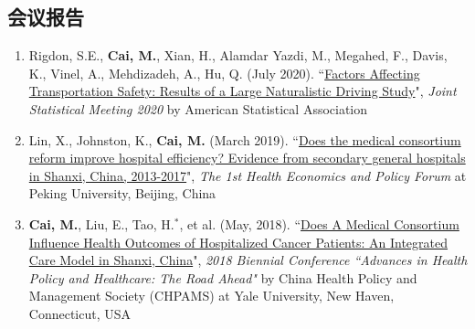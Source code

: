 \documentclass[11pt, a4paper]{article}
\newcommand{\years}[1]{\marginnote{\scriptsize #1}}
\begin{document}
	
	\subsection*{会议报告}
	\begin{enumerate}[leftmargin=0ex,itemsep=1ex]
		\item \years{2020}Rigdon, S.E., \textbf{Cai, M.}, Xian, H., Alamdar Yazdi, M., Megahed, F., Davis, K., Vinel, A., Mehdizadeh, A., Hu, Q. (July 2020). ``\ul{Factors Affecting Transportation Safety: Results of a Large Naturalistic Driving Study}", \emph{Joint Statistical Meeting 2020} by American Statistical Association
		
		\item \years{2019}Lin, X., Johnston, K., \textbf{Cai, M.} (March 2019). ``\ul{Does the medical consortium reform improve hospital efficiency? Evidence from secondary general hospitals in Shanxi, China, 2013-2017}", \emph{The 1st Health Economics and Policy Forum} at Peking University, Beijing, China
		
		\item \years{2018}\textbf{Cai, M.}, Liu, E., Tao, H.$^\ast$, et al. (May, 2018). ``\ul{Does A Medical Consortium Influence Health Outcomes of Hospitalized Cancer Patients: An Integrated Care Model in Shanxi, China}", \emph{2018 Biennial Conference ``Advances in Health Policy and Healthcare: The Road Ahead"} by China Health Policy and Management Society (CHPAMS) at Yale University, New Haven, Connecticut, USA
	\end{enumerate}
	
	
	
\end{document}
